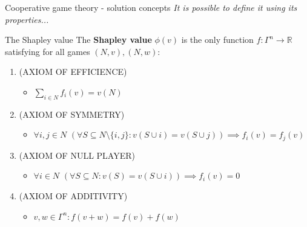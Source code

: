 \documentclass{beamer}
\begin{document}
\begin{frame}{Cooperative game theory - solution concepts}
    \textit{It is possible to define it using its properties...}
    \begin{block}{The Shapley value}
       The \textbf{Shapley value} $\phi(v)$ is the only function $f \colon \Gamma^n \to \mathbb{R}$ satisfying for all games $(N,v),(N,w)$:
        \begin{enumerate}
            \item (AXIOM OF EFFICIENCE)
            \begin{itemize}
                \item $\sum_{i \in N}f_i(v) = v(N)$
            \end{itemize}
            \item (AXIOM OF SYMMETRY)
            \begin{itemize}
                \item$\forall i,j \in N$ $(\forall S \subseteq N \setminus \{i,j\}: v(S \cup i) = v(S \cup j)) \implies f_i(v) = f_j(v)$
            \end{itemize}
            \item (AXIOM OF NULL PLAYER)
            \begin{itemize}
                \item $\forall i \in N$ $(\forall S \subseteq N: v(S) = v(S \cup i)) \implies f_i(v)=0$
            \end{itemize}
            \item (AXIOM OF ADDITIVITY)
            \begin{itemize}
                \item $v,w \in \Gamma^n: f(v+w)=f(v)+f(w)$
            \end{itemize}
        \end{enumerate}

    \end{block}
\end{frame}


\end{document}
